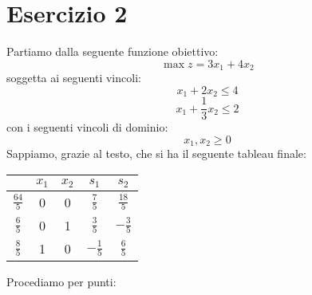\documentclass[a4paper,12pt, oneside]{book}
\begin{document}
\chapter{Esercizio 2}
Partiamo dalla seguente funzione obiettivo:
\[\max z=3x_1+4x_2\]
soggetta ai seguenti vincoli:
\[x_1+2x_2\leq 4\]
\[x_1+\frac{1}{3}x_2\leq 2\]
con i seguenti vincoli di dominio:
\[x_1,x_2\geq 0\]
Sappiamo, grazie al testo, che si ha il seguente tableau finale:
\begin{center}
  \begin{tabular}{c|cccc}
    & $x_1$ & $x_2$ & $s_1$ & $s_2$\\
    \hline
    $\frac{64}{5}$ & 0 & 0 & $\frac{7}{5}$ & $\frac{18}{5}$\\
    \hline
    $\frac{6}{5}$ & 0 & 1 & $\frac{3}{5}$ & $-\frac{3}{5}$\\
    $\frac{8}{5}$ & 1 & 0 & $-\frac{1}{5}$ & $\frac{6}{5}$\\
  \end{tabular}
\end{center}
Procediamo per punti:
\end{document}
